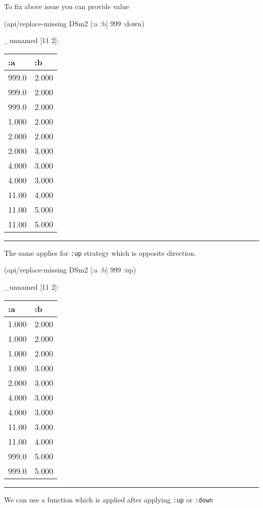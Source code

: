 \documentclass[]{article}
\newenvironment{Shaded}{\begin{snugshade}}{\end{snugshade}}
\newcommand{\DecValTok}[1]{\textcolor[rgb]{0.00,0.00,0.81}{#1}}
\newcommand{\AttributeTok}[1]{\textcolor[rgb]{0.77,0.63,0.00}{#1}}
\newcommand{\NormalTok}[1]{#1}
\begin{document}
To fix above issue you can provide value

\begin{Shaded}
\begin{Highlighting}[]
\NormalTok{(api/replace-missing DSm2 [}\AttributeTok{:a} \AttributeTok{:b}\NormalTok{] }\DecValTok{999} \AttributeTok{:down}\NormalTok{)}
\end{Highlighting}
\end{Shaded}

\_unnamed {[}11 2{]}:

\begin{longtable}[]{@{}ll@{}}
\toprule
:a & :b\tabularnewline
\midrule
\endhead
999.0 & 2.000\tabularnewline
999.0 & 2.000\tabularnewline
999.0 & 2.000\tabularnewline
1.000 & 2.000\tabularnewline
2.000 & 2.000\tabularnewline
2.000 & 3.000\tabularnewline
4.000 & 3.000\tabularnewline
4.000 & 3.000\tabularnewline
11.00 & 4.000\tabularnewline
11.00 & 5.000\tabularnewline
11.00 & 5.000\tabularnewline
\bottomrule
\end{longtable}

\begin{center}\rule{0.5\linewidth}{0.5pt}\end{center}

The same applies for \texttt{:up} strategy which is opposite direction.

\begin{Shaded}
\begin{Highlighting}[]
\NormalTok{(api/replace-missing DSm2 [}\AttributeTok{:a} \AttributeTok{:b}\NormalTok{] }\DecValTok{999} \AttributeTok{:up}\NormalTok{)}
\end{Highlighting}
\end{Shaded}

\_unnamed {[}11 2{]}:

\begin{longtable}[]{@{}ll@{}}
\toprule
:a & :b\tabularnewline
\midrule
\endhead
1.000 & 2.000\tabularnewline
1.000 & 2.000\tabularnewline
1.000 & 2.000\tabularnewline
1.000 & 3.000\tabularnewline
2.000 & 3.000\tabularnewline
4.000 & 3.000\tabularnewline
4.000 & 3.000\tabularnewline
11.00 & 3.000\tabularnewline
11.00 & 4.000\tabularnewline
999.0 & 5.000\tabularnewline
999.0 & 5.000\tabularnewline
\bottomrule
\end{longtable}

\begin{center}\rule{0.5\linewidth}{0.5pt}\end{center}

We can use a function which is applied after applying \texttt{:up} or
\texttt{:down}
\end{document}
